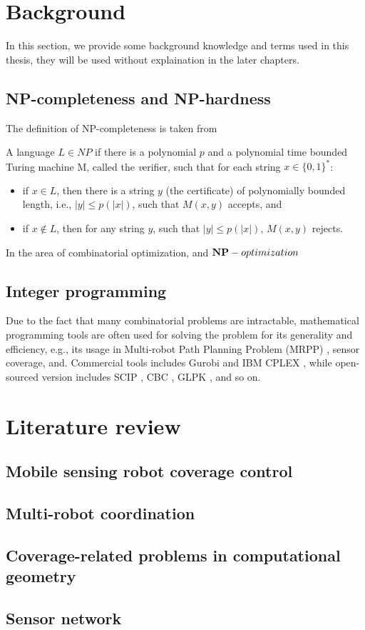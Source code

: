 \section{Background}
In this section, we provide some background knowledge and terms used in this thesis,
they will be used without explaination in the later chapters. 

\subsection{NP-completeness and NP-hardness}
The definition of NP-completeness is taken from \cite{vazirani2001approximation}
\begin{definition}[NP-completeness]
    A language $L\in NP$ if there is a polynomial $p$ and a polynomial time bounded Turing machine M, 
    called the {\textit verifier}, such that for each string $x\in \{0, 1\}^*$: 
\begin{itemize}
    \item if $x\in L$, then there is a string $y$ (the certificate) of polynomially bounded length, i.e., $|y| \leq p(|x|)$,
    such that $M(x, y)$ accepts, and 
    \item if $x\notin L$, then for any string $y$, such that $|y|\leq p(|x|)$, $M(x,y)$ rejects.
\end{itemize}
\end{definition}

In the area of combinatorial optimization, and ${\bold{NP}}-optimization$ 
\subsection{Integer programming}
Due to the fact that many combinatorial problems are intractable, mathematical programming tools are often 
used for solving the problem for its generality and efficiency, e.g., its usage in Multi-robot Path Planning Problem (MRPP) 
\cite{HanYu19IROS, GuoHanYu21ICRA}, sensor coverage, and. 
Commercial tools includes Gurobi \cite{optimization2019gurobi} and IBM CPLEX \cite{cplex2009v12}, while open-sourced version
includes SCIP \cite{achterberg2009scip}, CBC \cite{forrest2005cbc}, GLPK \cite{makhorin2008glpk}, and so on. 

\section{Literature review} 
\subsection{Mobile sensing robot coverage control}
\subsection{Multi-robot coordination}
\subsection{Coverage-related problems in computational geometry}
\subsection{Sensor network}
